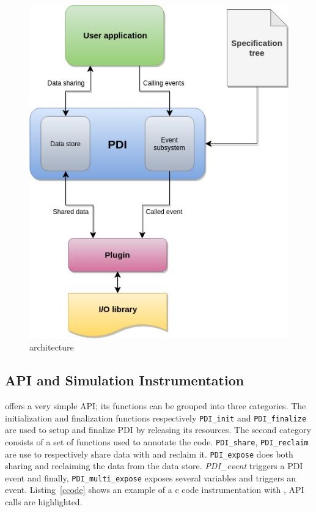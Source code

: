 \begin{figure}[tb]\centering
\includegraphics[scale=0.8]{figures/PDI_schema.jpg}
\caption{\pdi architecture}
\label{figpdiarchi}
\end{figure}

\subsection{\pdi API and Simulation Instrumentation}
\pdi offers a very simple API; its functions can be grouped into three categories. The initialization and finalization functions respectively \texttt{PDI\_init} and \texttt{PDI\_finalize} are used to setup and finalize PDI by releasing its resources. 
The second category consists of a set of functions used to annotate the code. \texttt{PDI\_share}, \texttt{PDI\_reclaim} are use to respectively share data with \pdi and reclaim it. \texttt{PDI\_expose} does both sharing and reclaiming the data from the data store. \textit{PDI\_event} triggers a PDI event and finally, \texttt{PDI\_multi\_expose} exposes several variables and triggers an event. Listing~\ref{ccode} shows an example of a c code instrumentation with \pdi, \pdi API calls are highlighted.

